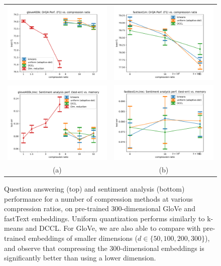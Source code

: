 \begin{figure}
	\centering
	\begin{small}
		\begin{tabular}{@{\hskip -0.0in}c@{\hskip -0.0in}c@{\hskip -0.0in}}
			\includegraphics[width=0.4\linewidth]{figures/glove400k_drqa_vs_compression.pdf} &
			\includegraphics[width=0.4\linewidth]{figures/fasttext1m_drqa_vs_compression.pdf} \\
			\includegraphics[width=0.4\linewidth]{figures/glove400k_trec_test-err_vs_compression.pdf} &
			\includegraphics[width=0.4\linewidth]{figures/fasttext1m_trec_test-err_vs_compression.pdf} \\
			\;\;\;\;\;(a) & \;\;\;\;\;\;(b) 
		\end{tabular}
	\end{small}
\caption{Question answering (top) and sentiment analysis (bottom) performance for a number of compression methods at various compression ratios, on pre-trained 300-dimensional GloVe and fastText embeddings.
Uniform quantization performs similarly to k-means and DCCL.  For GloVe, we are also able to compare with pre-trained embeddings of smaller dimensions ($d\in\{50,100,200,300\}$), and observe that compressing the 300-dimensional embeddings is significantly better than using a lower dimension.}
\label{fig:drqa_sent_results}
\end{figure}

